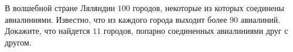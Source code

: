 \documentclass{article}
\begin{document}
В волшебной стране Ляляндии $100$ городов, некоторые из которых соединены авиалиниями. Известно, что из каждого города выходит более $90$ авиалиний. Докажите, что найдется $11$ городов, попарно соединенных авиалиниями друг с другом.
\end{document}
